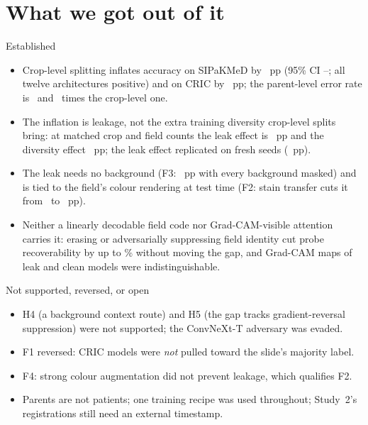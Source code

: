 



\section{What we got out of it}

\begin{workedbox}{Established}
\begin{itemize}[leftmargin=1.4em]
\item Crop-level splitting inflates accuracy on SIPaKMeD by \HoneEst~pp (95\% CI \HoneBootLo--\HoneBootHi; all
twelve architectures positive) and on CRIC by \HtwoEst~pp; the parent-level error rate is \SipErrorRatio\ and
\CricErrorRatio\ times the crop-level one.
\item The inflation is leakage, not the extra training diversity crop-level splits bring: at matched crop and field
counts the leak effect is \HthreeEst~pp and the diversity effect \DivEst~pp; the leak effect replicated on fresh seeds
(\HthreeRepEst~pp).
\item The leak needs no background (F3: \FthreeEst~pp with every background masked) and is tied to the field's colour
rendering at test time (F2: stain transfer cuts it from \LeakUnderOriginal\ to \LeakUnderStain~pp).
\item Neither a linearly decodable field code nor Grad-CAM-visible attention carries it: erasing or adversarially
suppressing field identity cut probe recoverability by up to \RecoveryCutMax\% without moving the gap, and Grad-CAM maps
of leak and clean models were indistinguishable.
\end{itemize}
\end{workedbox}

\begin{warningbox}{Not supported, reversed, or open}
\begin{itemize}[leftmargin=1.4em]
\item H4 (a background context route) and H5 (the gap tracks gradient-reversal suppression) were not supported; the
ConvNeXt-T adversary was evaded.
\item F1 reversed: CRIC models were \emph{not} pulled toward the slide's majority label.
\item F4: strong colour augmentation did not prevent leakage, which qualifies F2.
\item Parents are not patients; one training recipe was used throughout; Study~2's registrations still need an external
timestamp.
\end{itemize}
\end{warningbox}

